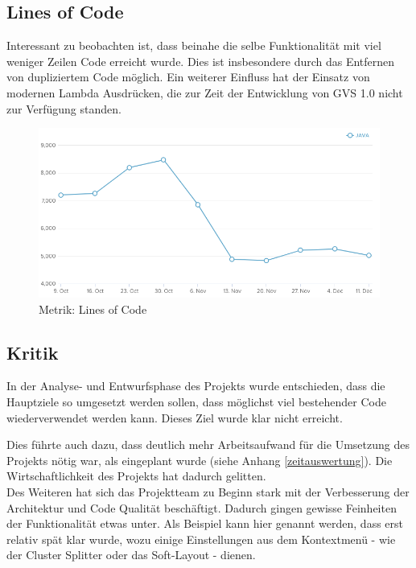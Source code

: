 \documentclass[11pt,a4paper,english,oneside]{book}
\numberwithin{equation}{chapter}
\begin{document}
	\subsection{Lines of Code} \label{ssec:lines-code}
	Interessant zu beobachten ist, dass beinahe die selbe Funktionalität mit viel weniger Zeilen Code erreicht wurde. Dies ist insbesondere durch das Entfernen von dupliziertem Code möglich. Ein weiterer Einfluss hat der Einsatz von modernen Lambda Ausdrücken, die zur Zeit der Entwicklung von GVS 1.0 nicht zur Verfügung standen.
	\begin{figure}[h!]
		\centering
		\includegraphics[width=\linewidth]{assets/images/metrics/lines_of_code}
		\caption{Metrik: Lines of Code}
		\label{metric-linesofcode}
	\end{figure}	

	
	\subsection{Kritik}
	In der Analyse- und Entwurfsphase des Projekts wurde entschieden, dass die Hauptziele so umgesetzt werden sollen, dass möglichst viel bestehender Code wiederverwendet werden kann. Dieses Ziel wurde klar nicht erreicht.
	
	Dies führte auch dazu, dass deutlich mehr Arbeitsaufwand für die Umsetzung des Projekts nötig war, als eingeplant wurde (siehe Anhang \ref{zeitauswertung}). Die Wirtschaftlichkeit des Projekts hat dadurch gelitten.\\
	
	\noindent
	Des Weiteren hat sich das Projektteam zu Beginn stark mit der Verbesserung der Architektur und Code Qualität beschäftigt. Dadurch gingen gewisse Feinheiten der Funktionalität etwas unter. Als Beispiel kann hier genannt werden, dass erst relativ spät klar wurde, wozu einige Einstellungen aus dem Kontextmenü - wie der Cluster Splitter oder das Soft-Layout - dienen.
\end{document}
